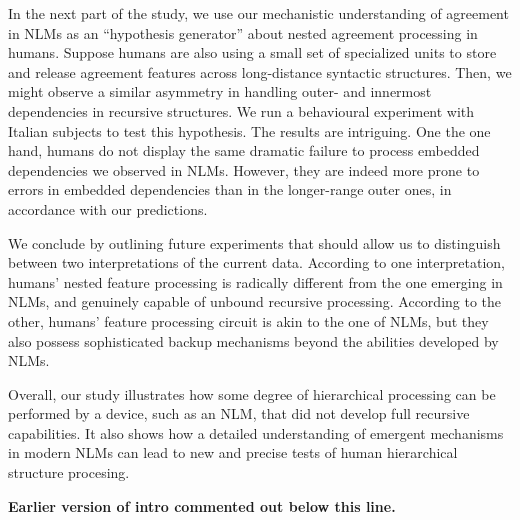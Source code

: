 In the next part of the study, we use our mechanistic understanding of
agreement in NLMs as an ``hypothesis generator''
\citep{Cichy:Kaiser:2019} about nested agreement processing in
humans. Suppose humans are also using a small set of specialized units
to store and release agreement features across long-distance syntactic
structures. Then, we might observe a similar asymmetry in handling
outer- and innermost dependencies in recursive structures. We run a
behavioural experiment with Italian subjects to test this
hypothesis. The results are intriguing. One the one hand, humans do
not display the same dramatic failure to process embedded dependencies
we observed in NLMs. However, they are indeed more prone to errors in
embedded dependencies than in the longer-range outer ones, in
accordance with our predictions.

We conclude by outlining future experiments that should allow us to
distinguish between two interpretations of the current data. According to one interpretation, humans' nested feature processing is radically
different from the one emerging in NLMs, and genuinely capable of
unbound recursive processing. According to the other, humans'
feature processing circuit is akin to the one of NLMs, but they also
possess sophisticated backup mechanisms beyond the abilities developed
by NLMs.

Overall, our study illustrates how some degree of hierarchical
processing can be performed by a device, such as an NLM, that did not
develop full recursive capabilities. It also shows how a detailed
understanding of emergent mechanisms in modern NLMs can lead to new
and precise tests of human hierarchical structure procesing.

\textbf{Earlier version of intro commented out below this line.}


